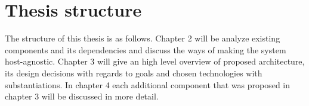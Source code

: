 \section{Thesis structure}
The structure of this thesis is as follows. Chapter 2 will be analyze existing components and its dependencies and discuss the ways of making the system host-agnostic. Chapter 3 will give an high level overview of proposed architecture, its design decisions with regards to goals and chosen technologies with substantiations. In chapter 4 each additional component that was proposed in chapter 3 will be discussed in more detail. 